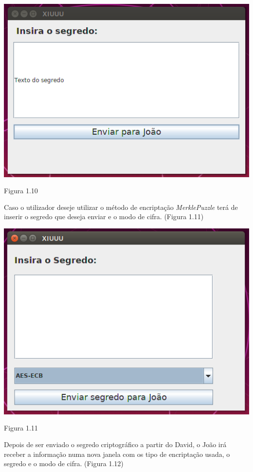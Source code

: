 \newline\begin{center}\includegraphics[scale=0.5]{img/secret.png}\newline\caption{Figura 1.10}\end{center}
Caso o utilizador deseje utilizar o método de encriptação \textit{MerklePuzzle} terá de inserir o segredo que deseja enviar e o modo de cifra. (Figura 1.11)
\newline\begin{center}\includegraphics[scale=0.5]{img/secretMerkle.png}\newline\caption{Figura 1.11}\end{center}
Depois de ser enviado o segredo criptográfico a partir do David, o João irá receber a informação numa nova janela com os tipo de encriptação usada, o segredo e o modo de cifra. (Figura 1.12)
